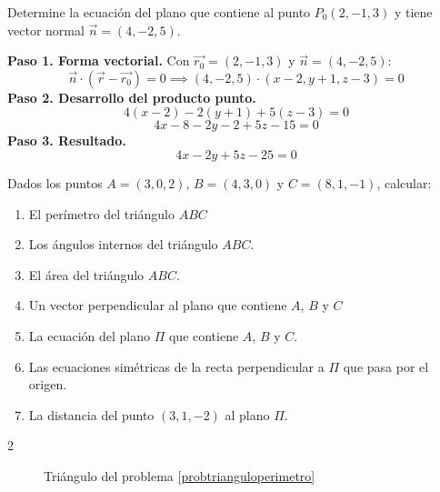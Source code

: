 \begin{example}
Determine la ecuación del plano que contiene al punto \(P_0(2, -1, 3)\) y tiene vector normal \(\vec{n} = (4, -2, 5)\).
\begin{myproof}
\textbf{Paso 1. Forma vectorial.} Con $\vec{r_0}=(2,-1,3)$ y $\vec{n}=(4,-2,5)$:
\[
\vec{n} \cdot (\vec{r} - \vec{r_0}) = 0 \implies (4, -2, 5) \cdot (x-2, y+1, z-3) = 0
\]
\textbf{Paso 2. Desarrollo del producto punto.}
\[
4(x-2) - 2(y+1) + 5(z-3) = 0
\]
\[
4x - 8 - 2y - 2 + 5z - 15 = 0
\]
\textbf{Paso 3. Resultado.}
\[
\boxed{4x - 2y + 5z - 25 = 0}
\]
\end{myproof}
\end{example}


\begin{example}\label{probtrianguloperimetro}
Dados los puntos $A=(3,0,2)$, $B=(4,3,0)$ y $C=(8,1,-1)$, calcular:
\begin{enumerate}[$(a)$]
    \item El perímetro del triángulo $ABC$
    \item Los ángulos internos del triángulo $ABC.$
    \item El área del triángulo $ABC.$
        \item Un vector perpendicular al plano que contiene $A$, $B$ y $C$
    \item La ecuación del plano $\Pi$ que contiene $A$, $B$ y $C$.
    \item Las ecuaciones simétricas de la recta perpendicular a $\Pi$ que pasa por el origen.
    \item La distancia del punto $(3,1,-2)$ al plano $\Pi.$
\end{enumerate}

\begin{myproof}
\begin{multicols}{2}
\begin{figure}[H]
\centering
{}
\caption{Triángulo del problema \ref{probtrianguloperimetro}}
\label{fig:probtriangulo_datos}
\end{figure}


\end{multicols}
\end{myproof}
\end{example}
